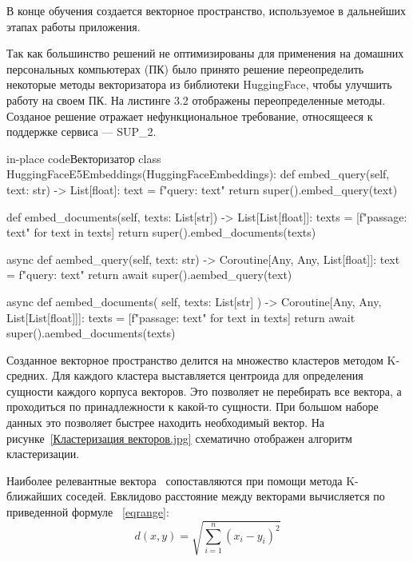 
В конце обучения создается векторное пространство, используемое в дальнейших
этапах работы приложения.

Так как большинство решений не оптимизированы для применения на домашних
персональных компьютерах (ПК) было принято решение переопределить некоторые методы
векторизатора из библиотеки HuggingFace, чтобы улучшить работу на своем ПК.
На листинге 3.2 отображены переопределенные методы. Созданое решение отражает
нефункциональное требование, относящееся к поддержке сервиса --- SUP\_2.

\begin{codepiece}{in-place code}{Векторизатор}
    class HuggingFaceE5Embeddings(HuggingFaceEmbeddings):
        def embed_query(self, text: str) -> List[float]:
            text = f"query: {text}"
            return super().embed_query(text)
    
        def embed_documents(self, texts: List[str]) -> List[List[float]]:
            texts = [f"passage: {text}" for text in texts]
            return super().embed_documents(texts)
    
        async def aembed_query(self, text: str) -> Coroutine[Any, Any, List[float]]:
            text = f"query: {text}"
            return await super().aembed_query(text)
    
        async def aembed_documents(
            self, texts: List[str]
        ) -> Coroutine[Any, Any, List[List[float]]]:
            texts = [f"passage: {text}" for text in texts]
            return await super().aembed_documents(texts)
\end{codepiece}


Созданное векторное пространство делится на множество кластеров
методом K-средних. Для каждого кластера выставляется центроида для
определения сущности каждого корпуса векторов. Это позволяет не перебирать все
вектора, а проходиться по принадлежности к какой-то сущности. При большом
наборе данных это позволяет быстрее находить необходимый вектор.
На рисунке~\ref{Кластеризация векторов.jpg} схематично отображен алгоритм
кластеризации.


Наиболее релевантные вектора~\cite{vec} сопоставляются при помощи метода K-ближайших 
соседей. Евклидово расстояние между векторами вычисляется по приведенной формуле
~\ref{eqrange}:\\
\begin{equation} \label{eqrange}
    d(x,y)=\sqrt{\sum_{i=1}^{n}{(x_i-y_i)}^2}
\end{equation}

